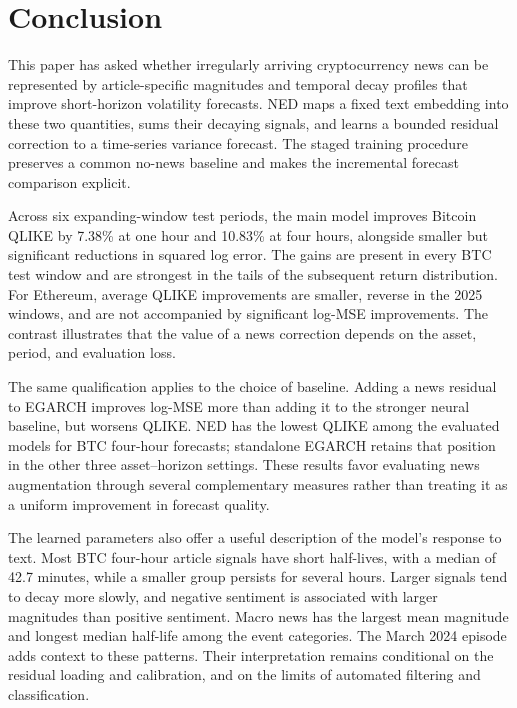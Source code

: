 \section{Conclusion}
\label{sec:conclusion}

This paper has asked whether irregularly arriving cryptocurrency news
can be represented by article-specific magnitudes and temporal decay
profiles that improve short-horizon volatility forecasts. NED maps
a fixed text embedding into these two quantities, sums their decaying
signals, and learns a bounded residual correction to a time-series
variance forecast. The staged training procedure preserves a common
no-news baseline and makes the incremental forecast comparison explicit.

Across six expanding-window test periods, the main model improves
Bitcoin QLIKE by 7.38\% at one hour and 10.83\% at four hours,
alongside smaller but significant reductions in squared log error.
The gains are present in every BTC test window and are strongest
in the tails of the subsequent return distribution. For Ethereum,
average QLIKE improvements are smaller, reverse in the 2025 windows,
and are not accompanied by significant log-MSE improvements.
The contrast illustrates that the value of a news correction depends
on the asset, period, and evaluation loss.

The same qualification applies to the choice of baseline. Adding a
news residual to EGARCH improves log-MSE more than adding it to the
stronger neural baseline, but worsens QLIKE. NED has the lowest QLIKE
among the evaluated models for BTC four-hour forecasts; standalone
EGARCH retains that position in the other three asset--horizon
settings. These results favor evaluating news augmentation through
several complementary measures rather than treating it as a uniform
improvement in forecast quality.



The learned parameters also offer a useful description of the model's
response to text. Most BTC four-hour article signals have short
half-lives, with a median of 42.7 minutes, while a smaller group
persists for several hours. Larger signals tend to decay more slowly,
and negative sentiment is associated with larger magnitudes than
positive sentiment. Macro news has the largest mean magnitude and
longest median half-life among the event categories. The March 2024
episode adds context to these patterns. Their interpretation remains
conditional on the residual loading and calibration, and on the
limits of automated filtering and classification.


